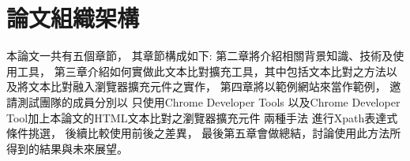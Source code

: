 \section{論文組織架構}
\indent
本論文一共有五個章節，
其章節構成如下:
第二章將介紹相關背景知識、技術及使用工具，
第三章介紹如何實做此文本比對擴充工具，其中包括文本比對之方法以及將文本比對融入瀏覽器擴充元件之實作，
第四章將以範例網站來當作範例，
邀請測試團隊的成員分別以
只使用Chrome Developer Tools
以及Chrome Developer Tool加上本論文的HTML文本比對之瀏覽器擴充元件
兩種手法
進行Xpath表達式條件挑選，
後續比較使用前後之差異，
最後第五章會做總結，討論使用此方法所得到的結果與未來展望。